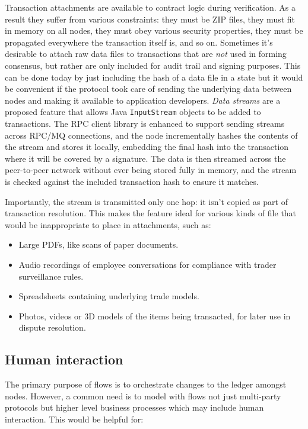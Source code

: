 \documentclass{article}
\begin{document}
Transaction attachments are available to contract logic during verification. As a result they suffer from various
constraints: they must be ZIP files, they must fit in memory on all nodes, they must obey various security
properties, they must be propagated everywhere the transaction itself is, and so on. Sometimes it's desirable to
attach raw data files to transactions that are \emph{not} used in forming consensus, but rather are only included
for audit trail and signing purposes. This can be done today by just including the hash of a data file in a state
but it would be convenient if the protocol took care of sending the underlying data between nodes and making it
available to application developers. \emph{Data streams} are a proposed feature that allows Java
\texttt{InputStream} objects to be added to transactions. The RPC client library is enhanced to support sending
streams across RPC/MQ connections, and the node incrementally hashes the contents of the stream and stores it
locally, embedding the final hash into the transaction where it will be covered by a signature. The data is then
streamed across the peer-to-peer network without ever being stored fully in memory, and the stream is checked
against the included transaction hash to ensure it matches.

Importantly, the stream is transmitted only one hop: it isn't copied as part of transaction resolution. This makes
the feature ideal for various kinds of file that would be inappropriate to place in attachments, such as:

\begin{itemize}
    \item Large PDFs, like scans of paper documents.
    \item Audio recordings of employee conversations for compliance with trader surveillance rules.
    \item Spreadsheets containing underlying trade models.
    \item Photos, videos or 3D models of the items being transacted, for later use in dispute resolution.
\end{itemize}

\subsection{Human interaction}

The primary purpose of flows is to orchestrate changes to the ledger amongst nodes. However, a common need is
to model with flows not just multi-party protocols but higher level business processes which may include human
interaction. This would be helpful for:
\end{document}
